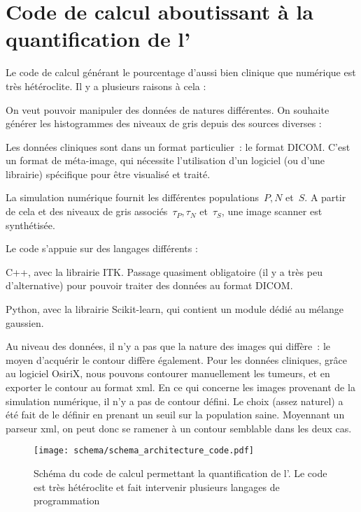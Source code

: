 \documentclass[main.tex]{subfiles}
\begin{document}
\section{Code de calcul aboutissant à la quantification de l'\hetero}
Le code de calcul générant le pourcentage d'\hetero aussi bien clinique que numérique est très hétéroclite. Il y a plusieurs raisons à cela :
\begin{myitemize}
\item On veut pouvoir manipuler des données de natures différentes. On souhaite générer les histogrammes des niveaux de gris depuis des sources diverses :
\begin{myitemize}[label=$-$]
\item Les données cliniques sont dans un format particulier~: le format DICOM. C'est un format de méta-image, qui nécessite l'utilisation d'un logiciel (ou d'une librairie) spécifique pour être visualisé et traité. 
\item La simulation numérique fournit les différentes populations~$P,N$ et~$S$. A partir de cela et des niveaux de gris associés~$\tau_P, \tau_N$ et~$\tau_S$, une image scanner est synthétisée.
\end{myitemize}
\item Le code s'appuie sur des langages différents :
\begin{myitemize}[label=$-$]
\item C++, avec la librairie ITK. Passage quasiment obligatoire (il y a très peu d'alternative) pour pouvoir traiter des données au format DICOM.
\item Python, avec la librairie Scikit-learn, qui contient un module dédié au mélange gaussien.
\end{myitemize}
\end{myitemize}

Au niveau des données, il n'y a pas que la nature des images qui diffère~: le moyen d'acquérir le contour diffère également. 
Pour les données cliniques, grâce au logiciel OsiriX, nous pouvons contourer manuellement les tumeurs, et en exporter le contour au format xml. 
En ce qui concerne les images provenant de la simulation numérique, il n'y a pas de contour défini. Le choix (assez naturel) a été fait de le définir en prenant un seuil sur la population saine. Moyennant un parseur xml, on peut donc se ramener à un contour semblable dans les deux cas.

\begin{sidewaysfigure}
\centering
\vfill
\texttt{[image: schema/schema\_architecture\_code.pdf]} %
\caption{\label{fig:schema_struct_code}Schéma du code de calcul permettant la quantification de l'\hetero. Le code est très hétéroclite et fait intervenir plusieurs langages de programmation}
\end{sidewaysfigure}
\end{document}
